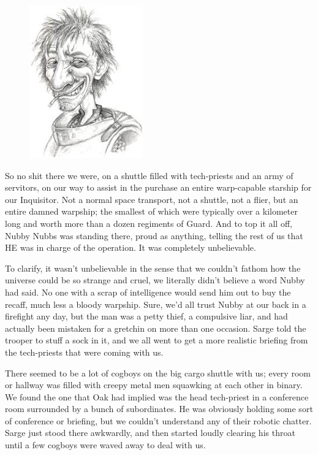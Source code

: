 


\begin{figure}
	\begin{center}
		\includegraphics[width=\figwidth]{pics/7/2.png}
	\end{center}
\end{figure}
So no shit there we were, on a shuttle filled with tech-priests and an army of servitors, on our way to assist in the purchase an entire warp-capable starship for our Inquisitor. 
Not a normal space transport, not a shuttle, not a flier, but an entire damned warpship; 
the smallest of which were typically over a kilometer long and worth more than a dozen regiments of Guard. 
And to top it all off, Nubby Nubbs was standing there, proud as anything, telling the rest of us that HE was in charge of the operation. 
It  was completely unbelievable.

To clarify, it wasn’t unbelievable in the sense that we couldn’t fathom how the universe could be so strange and cruel, we literally didn’t believe a word Nubby had said. 
No one with a scrap of intelligence would send him out to buy the recaff, much less a bloody warpship. 
Sure, we’d all trust Nubby at our back in a firefight any day, but the man was a petty thief, a compulsive liar, and had actually been mistaken for a gretchin on more than one occasion. 
Sarge told the trooper to stuff a sock in it, and we all went to get a more realistic briefing from the tech-priests that were coming with us.

There seemed to be a lot of cogboys on the big cargo shuttle with us; 
every room or hallway was filled with creepy metal men squawking at each other in binary. 
We found the one that Oak had implied was the head tech-priest in a conference room surrounded by a bunch of subordinates. 
He was obviously holding some sort of conference or briefing, but we couldn’t understand any of their robotic chatter. 
Sarge just stood there awkwardly, and then started loudly clearing his throat until a few cogboys were waved away to deal with us.

